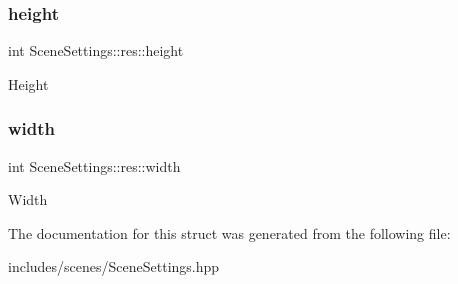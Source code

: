 \subsubsection{\texorpdfstring{height}{height}}
{\footnotesize\ttfamily int Scene\+Settings\+::res\+::height}

Height \mbox{\label{struct_scene_settings_1_1res_ab777453ece0b8d50819d19724055a853}} 
\subsubsection{\texorpdfstring{width}{width}}
{\footnotesize\ttfamily int Scene\+Settings\+::res\+::width}

Width 

The documentation for this struct was generated from the following file\+:\begin{DoxyCompactItemize}
\item 
includes/scenes/Scene\+Settings.\+hpp\end{DoxyCompactItemize}
